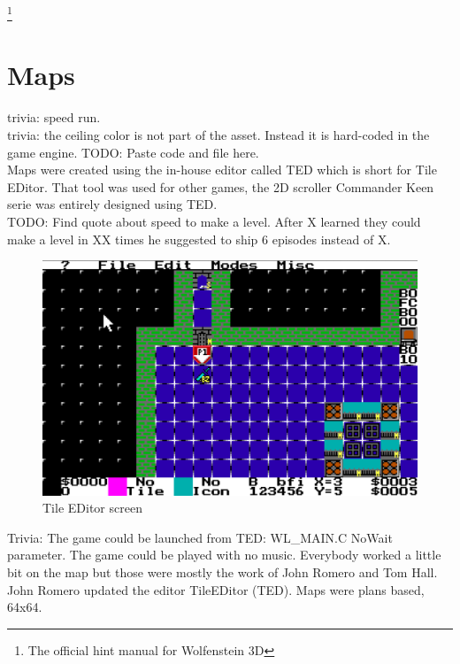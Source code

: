 \documentclass[book.tex]{subfiles}
\begin{document}
\footnote{The official hint manual for Wolfenstein 3D}
\section{Maps}
trivia: speed run.\\
trivia: the ceiling color is not part of the asset. Instead it is hard-coded in the game engine. TODO: Paste code and file here.\\
Maps were created using the in-house editor called TED which is short for Tile EDitor. That tool was used for other games, the 2D scroller Commander Keen serie was entirely designed using TED.\\
TODO: Find quote about speed to make a level. After X learned they could make a level in XX times he suggested to ship 6 episodes instead of X.
\begin{figure}[H]
\centering
 \includegraphics[width=\textwidth]{imgs/TED.png}
 \caption{Tile EDitor screen} \label{fig:mips}
 \end{figure}
 Trivia: The game could be launched from TED: WL\_MAIN.C NoWait parameter. The game could be played with no music.
Everybody worked a little bit on the map but those were mostly the work of John Romero and Tom Hall. John Romero updated the editor TileEDitor (TED). Maps were plans based, 64x64.\\
\end{document}
